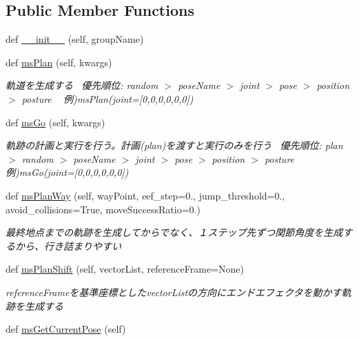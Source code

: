 \subsection*{Public Member Functions}
\begin{DoxyCompactItemize}
\item 
def \hyperlink{classmsMoveGroup_1_1msMoveGroup_a9800d2afd662bf45ccfb978007a55f08}{\+\_\+\+\_\+init\+\_\+\+\_\+} (self, group\+Name)
\item 
def \hyperlink{classmsMoveGroup_1_1msMoveGroup_aadc2635eb78a0043d4f30ecc30eae959}{ms\+Plan} (self, kwargs)
\begin{DoxyCompactList}\small\item\em 軌道を生成する~\newline
 優先順位\+: random $>$ pose\+Name $>$ joint $>$ pose $>$ position $>$ posture ~\newline
 例)ms\+Plan(joint=\mbox{[}0,0,0,0,0,0\mbox{]}) \end{DoxyCompactList}\item 
def \hyperlink{classmsMoveGroup_1_1msMoveGroup_aa3914f9104f9459d971f10d49fbf2d62}{ms\+Go} (self, kwargs)
\begin{DoxyCompactList}\small\item\em 軌跡の計画と実行を行う。計画(plan)を渡すと実行のみを行う~\newline
 優先順位\+: plan $>$ random $>$ pose\+Name $>$ joint $>$ pose $>$ position $>$ posture ~\newline
 例)ms\+Go(joint=\mbox{[}0,0,0,0,0,0\mbox{]}) \end{DoxyCompactList}\item 
def \hyperlink{classmsMoveGroup_1_1msMoveGroup_a3261620111e34668e764c0d522794b3a}{ms\+Plan\+Way} (self, way\+Point, eef\+\_\+step=0., jump\+\_\+threshold=0., avoid\+\_\+collisions=True, move\+Success\+Ratio=0.)\hypertarget{classmsMoveGroup_1_1msMoveGroup_a3261620111e34668e764c0d522794b3a}{}\label{classmsMoveGroup_1_1msMoveGroup_a3261620111e34668e764c0d522794b3a}

\begin{DoxyCompactList}\small\item\em 最終地点までの軌跡を生成してからでなく、１ステップ先ずつ関節角度を生成するから、行き詰まりやすい \end{DoxyCompactList}\item 
def \hyperlink{classmsMoveGroup_1_1msMoveGroup_a5a35e7ca351f7d6ae9a6f8a78091061d}{ms\+Plan\+Shift} (self, vector\+List, reference\+Frame=None)
\begin{DoxyCompactList}\small\item\em reference\+Frameを基準座標としたvector\+Listの方向にエンドエフェクタを動かす軌跡を生成する \end{DoxyCompactList}\item 
def \hyperlink{classmsMoveGroup_1_1msMoveGroup_a77ea08da7914e81740daa8a35cf8bf69}{ms\+Get\+Current\+Pose} (self)\hypertarget{classmsMoveGroup_1_1msMoveGroup_a77ea08da7914e81740daa8a35cf8bf69}{}\label{classmsMoveGroup_1_1msMoveGroup_a77ea08da7914e81740daa8a35cf8bf69}


\end{DoxyCompactItemize}
